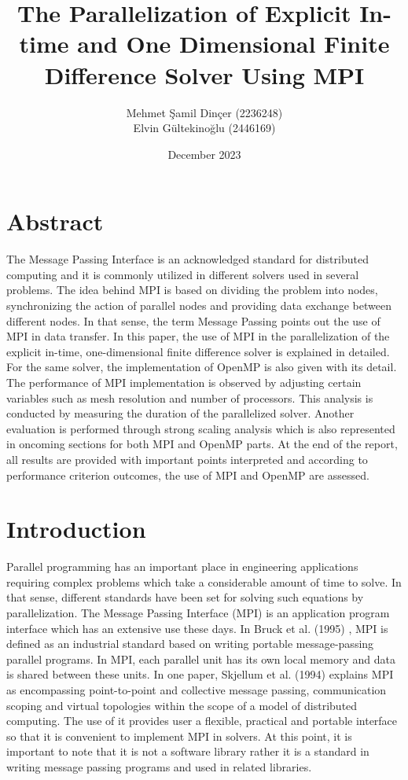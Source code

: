 \documentclass{article}
\title{The Parallelization of Explicit In-time and One Dimensional Finite Difference Solver Using MPI}
\author{Mehmet Şamil Dinçer (2236248)\\
        Elvin Gültekinoğlu (2446169)}
\date{December 2023}
\begin{document}
\maketitle

\section{Abstract}

The Message Passing Interface is an acknowledged standard for distributed computing and it is commonly utilized in different solvers used in several problems. The idea behind MPI is based on dividing the problem into nodes, synchronizing the action of parallel nodes and providing data exchange between different nodes. In that sense, the term Message Passing points out the use of MPI in data transfer. In this paper, the use of MPI in the parallelization of the explicit in-time, one-dimensional finite difference solver is explained in detailed. For the same solver, the implementation of OpenMP is also given with its detail. The performance of MPI implementation is observed by adjusting certain variables such as mesh resolution and number of processors. This analysis is conducted by measuring the duration of the parallelized solver. Another evaluation is performed through strong scaling analysis which is also represented in oncoming sections for both MPI and OpenMP parts. At the end of the report, all results are provided with important points interpreted and according to performance criterion outcomes, the use of MPI and OpenMP are assessed. 

\clearpage

\section{Introduction}

Parallel programming has an important place in engineering applications requiring complex problems which take a considerable amount of time to solve. In that sense, different standards have been set for solving such equations by parallelization. The Message Passing Interface (MPI) is an application program interface which has an extensive use these days. In Bruck et al. (1995) \cite{bruck1995efficient}, MPI is defined as an industrial standard based on writing portable message-passing parallel programs. In MPI, each parallel unit has its own local memory and data is shared between these units. In one paper, Skjellum et al. (1994) \cite{skjellum1994extending} explains MPI as encompassing point-to-point and collective message passing, communication scoping and virtual topologies within the scope of a model of distributed computing. The use of it provides user a flexible, practical and portable interface so that it is convenient to implement MPI in solvers. At this point, it is important to note that it is not a software library rather it is a standard in writing message passing programs and used in related libraries. \\
\end{document}
